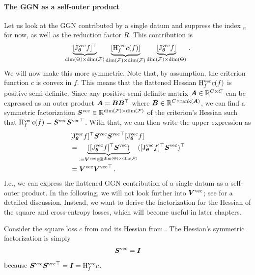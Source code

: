 \paragraph{The GGN as a self-outer product}
Let us look at the GGN contributed by a single datum and suppress the index $_n$ for now, as well as the reduction factor $R$.
This contribution is
\begin{align*}
  \underbrace{[\mathrm{J}_{{\bm{\theta}}}^{\operatorname{vec}} f]^{\top}}_{\dim(\Theta) \times \dim({\mathcal{F}})}
  \underbrace{[\mathrm{H}^{\operatorname{vec}}_{f} c(f)]}_{\dim({\mathcal{F}}) \times \dim({\mathcal{F}})}
  \underbrace{[\mathrm{J}_{{\bm{\theta}}}^{\operatorname{vec}} f]}_{\dim({\mathcal{F}}) \times \dim(\Theta)}\,.
\end{align*}
We will now make this more symmetric.
Note that, by assumption, the criterion function $c$ is convex in $f$.
This means that the flattened Hessian $\mathrm{H}^{\operatorname{vec}}_{f} c(f)$ is positive semi-definite.
Since any positive semi-definite matrix ${\bm{A}} \in {\mathbb{R}}^{C \times C}$ can be expressed as an outer product ${\bm{A}} = {\bm{B}} {\bm{B}}^{\top}$ where ${\bm{B}} \in {\mathbb{R}}^{C \times \operatorname{rank}({\bm{A}})}$, we can find a symmetric factorization ${\bm{S}}^{\operatorname{vec}} \in {\mathbb{R}}^{\dim({\mathcal{F}}) \times \dim({\mathcal{F}})}$ of the criterion's Hessian such that $\mathrm{H}^{\operatorname{vec}}_{f} c(f) = {\bm{S}}^{\operatorname{vec}} {{\bm{S}}^{\operatorname{vec}}}^{\top}$.
With that, we can then write the upper expression as
\begin{align*}
  &[\mathrm{J}_{{\bm{\theta}}}^{\operatorname{vec}} f]^{\top} {\bm{S}}^{\operatorname{vec}} {{\bm{S}}^{\operatorname{vec}}}^{\top} [\mathrm{J}_{{\bm{\theta}}}^{\operatorname{vec}} f]
  \\
  &=
  \underbrace{([\mathrm{J}_{{\bm{\theta}}}^{\operatorname{vec}} f]^{\top} {\bm{S}}^{\operatorname{vec}})}_{\coloneq {\bm{V}}^{\operatorname{vec}} \in {\mathbb{R}}^{\dim(\Theta) \times \dim({\mathcal{F}})}}
  ([\mathrm{J}_{{\bm{\theta}}}^{\operatorname{vec}} f]^{\top} {\bm{S}}^{\operatorname{vec}})^{\top}
  \\
  &=
  {\bm{V}}^{\operatorname{vec}} {{\bm{V}}^{\operatorname{vec}}}^{\top}\,.
\end{align*}
I.e., we can express the flattened GGN contribution of a single datum as a self-outer product.
In the following, we will not look further into ${\bm{V}}^{\operatorname{vec}}$; see \cite{dangel2022vivit,papyan2019measurements} for a detailed discussion. Instead, we want to derive the factorization for the Hessian of the square and cross-entropy losses, which will become useful in later chapters.
\begin{example}\label{ex:mseloss_hessian_factorization}
  Consider the square loss $c$ from  and its Hessian from .
  The Hessian's symmetric factorization is simply
  \begin{align*}
    {\bm{S}}^{\operatorname{vec}} = {\bm{I}}
  \end{align*}
  because ${\bm{S}}^{\operatorname{vec}} {{\bm{S}}^{\operatorname{vec}}}^{\top} = {\bm{I}} = \mathrm{H}_{f}^{\operatorname{vec}}c$.
\end{example}

